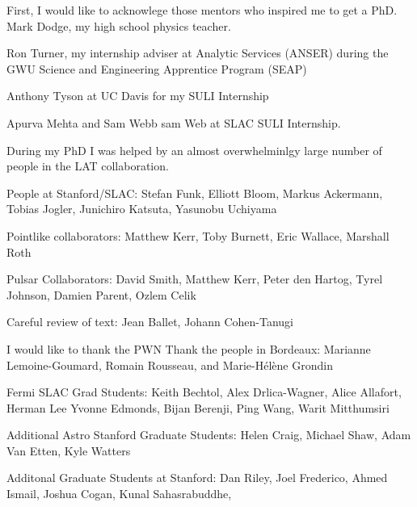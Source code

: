 

First, I would like to acknowlege those mentors who inspired me to get a PhD.
Mark Dodge, my high school physics teacher.

Ron Turner, my internship adviser at Analytic Services (ANSER) during the 
GWU Science and Engineering Apprentice Program (SEAP)

Anthony Tyson at UC Davis for my SULI Internship

Apurva Mehta and Sam Webb sam Web at SLAC SULI Internship.


During my PhD I was helped by an almost overwhelminlgy large 
number of people in the LAT collaboration.

People at Stanford/SLAC: Stefan Funk, Elliott Bloom, 
Markus Ackermann, Tobias Jogler, Junichiro Katsuta, Yasunobu Uchiyama

Pointlike collaborators: Matthew Kerr, Toby Burnett, Eric Wallace, Marshall Roth

Pulsar Collaborators: David Smith, Matthew Kerr, Peter den Hartog, Tyrel Johnson, Damien Parent, Ozlem Celik

Careful review of text: Jean Ballet, Johann Cohen-Tanugi

I would like to thank the PWN
Thank the people in Bordeaux: Marianne Lemoine-Goumard, Romain Rousseau, and Marie-H\'el\`ene Grondin


Fermi SLAC Grad Students: Keith Bechtol, Alex Drlica-Wagner, Alice Allafort, Herman Lee
Yvonne Edmonds, Bijan Berenji, Ping Wang, Warit Mitthumsiri


Additional Astro Stanford Graduate Students: Helen Craig, Michael Shaw, Adam Van Etten, Kyle Watters

Additonal Graduate Students at Stanford: Dan Riley, Joel Frederico, Ahmed Ismail, Joshua Cogan, Kunal Sahasrabuddhe,
